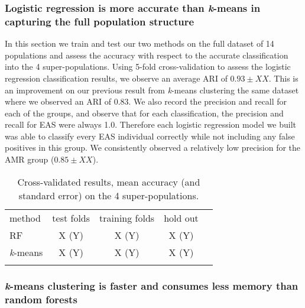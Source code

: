 \documentclass{llncs}
\newcommand{\kMeans}{\textit{k}-means}
\begin{document}
{\subsubsection{Logistic regression is more accurate than \kMeans{} in capturing the full population structure}
In this section we train and test our two methods on the full dataset of 14 populations and assess the accuracy with respect to the accurate classification into the 4 super-populations.
Using 5-fold cross-validation to assess the logistic regression classification results, we observe an average ARI of \(0.93 \pm{} XX\). This is an improvement on our previous result from \kMeans{} clustering the same dataset
where we observed an ARI of \(0.83\).
We also record the precision and recall for each of the groups, and observe that for each classification, the precision and recall for EAS were always 1.0. Therefore each logistic regression model we built was able to classify every EAS individual correctly while not including any false positives in this group.
We consistently observed a relatively low precision for the AMR group (\(0.85\pm{} XX \)). 



\begin{table}
\caption{Cross-validated results, mean accuracy (and standard error) on the 4 super-populations.}
\begin{center}
\renewcommand{\arraystretch}{1.4}
\setlength\tabcolsep{3pt}
\begin{tabular}{lcccc}
\hline\noalign{\smallskip}
method  & test folds & training folds & hold out \\
RF  & X (Y) & X (Y) & X (Y) \\
\kMeans & X (Y) & X (Y) & X (Y) \\
\noalign{\smallskip}
\hline
\end{tabular}
\end{center}
\end{table}







\subsubsection{\kMeans{} clustering is faster and consumes less memory than random forests}

}
\end{document}
